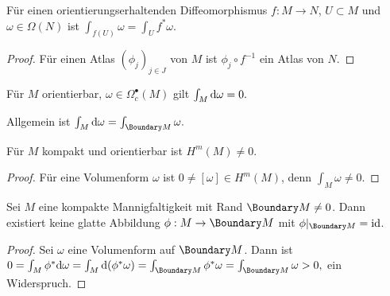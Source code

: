 \begin{kor}[Transformationsformel] \label{7.9}
    Für einen orientierungserhaltenden Diffeomorphismus $f: M \to N$, $U \subset M$ und $\omega \in \Omega(N)$ ist
    \begin{math}
        \int_{f(U)} \omega = \int_U f^* \omega.
    \end{math}
    \begin{proof}
        Für einen Atlas $(\phi_j)_{j \in J}$ von $M$ ist $\phi_j \circ f^{-1}$ ein Atlas von $N$.
    \end{proof}
\end{kor}

\begin{st} \label{7.10}
    Für $M$ orientierbar, $\omega \in \Omega_c^\bullet(M)$ gilt
    \begin{math}
        \int_M \mathrm{d} \omega = 0.
    \end{math}
    \begin{note}
        Allgemein ist
        \begin{math}
            \int_M \d \omega = \int_{\Boundary M} \omega.
        \end{math}
    \end{note}
\end{st}

\begin{kor} \label{7.11}
    Für $M$ kompakt und orientierbar ist $H^m(M) \neq 0$.
    \begin{proof}
        Für eine Volumenform $\omega$ ist $0 \neq [\omega] \in H^m(M)$, denn $\int_ M \omega \neq 0$.
    \end{proof}
\end{kor}

\begin{kor} \label{7.12}
    Sei $M$ eine kompakte Mannigfaltigkeit mit Rand $\Boundary M \neq 0$.
    Dann existiert keine glatte Abbildung $\phi: M \to \Boundary M$ mit $\phi|_{\Boundary M} = \id$.
    \begin{proof}
        Sei $\omega$ eine Volumenform auf $\Boundary M$.
        Dann ist
        \begin{math}
            0 = \int_M \phi^* \d \omega
            = \int_M \d(\phi^* \omega)
            = \int_{\Boundary M} \phi^* \omega
            = \int_{\Boundary M} \omega
            > 0,
        \end{math}
        ein Widerspruch.
    \end{proof}
\end{kor}

